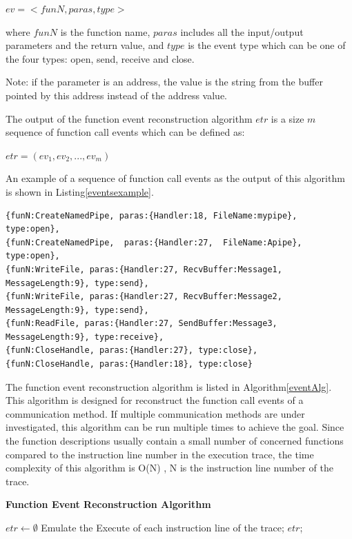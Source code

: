 $ev = <funN, paras, type>$

where $funN$ is the function name, $paras$ includes all the input/output parameters and the return value, and $type$ is the event type which can be one of the four types: open, send, receive and close.

Note: if the parameter is an address, the value is the string from the buffer pointed by this address instead of the address value.

The output of the function event reconstruction algorithm $etr$ is a size $m$ sequence of function call events which can be defined as:

$etr = (ev_1, ev_2, ..., ev_m)$

An example of a sequence of function call events as the output of this algorithm is shown in Listing\ref{eventsexample}.

\begin{lstlisting}[caption= Example of  $etr$, label=eventsexample]
{funN:CreateNamedPipe, paras:{Handler:18, FileName:mypipe}, type:open},
{funN:CreateNamedPipe,  paras:{Handler:27,  FileName:Apipe}, type:open},
{funN:WriteFile, paras:{Handler:27, RecvBuffer:Message1, MessageLength:9}, type:send},
{funN:WriteFile, paras:{Handler:27, RecvBuffer:Message2, MessageLength:9}, type:send},
{funN:ReadFile, paras:{Handler:27, SendBuffer:Message3, MessageLength:9}, type:receive},
{funN:CloseHandle, paras:{Handler:27}, type:close},
{funN:CloseHandle, paras:{Handler:18}, type:close}
\end{lstlisting}

The function event reconstruction algorithm is listed in Algorithm\ref{eventAlg}. This algorithm is designed for reconstruct the function call events of a communication method. If multiple communication methods are under investigated, this algorithm can be run multiple times to achieve the goal. Since the function descriptions usually contain a  small number of concerned functions compared to the instruction line number in the execution trace, the time complexity of this algorithm is O(N) , N is the instruction line number of the trace.

\begin{algorithm}[H]
\DontPrintSemicolon
\caption{{\bf Function Event Reconstruction Algorithm} \label{eventAlg}}
$etr \leftarrow \emptyset$\; 
Emulate the Execute of each instruction line of the trace;\;
\KwRet $etr$;\;
\end{algorithm} 


